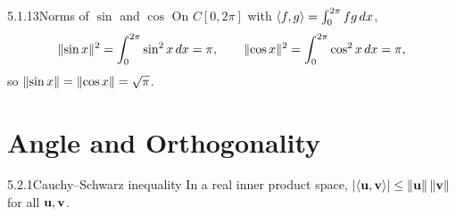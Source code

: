 \begin{exmp}{5.1.13}{Norms of $\sin$ and $\cos$}
On $C[0,2\pi]$ with $\langle f, g \rangle=\int_0^{2\pi}fg\,dx$,
\[
\lVert \sin x \rVert^2=\int_0^{2\pi}\sin^2x\,dx=\pi,\qquad \lVert \cos x \rVert^2=\int_0^{2\pi}\cos^2x\,dx=\pi,
\]
so $\lVert \sin x \rVert=\lVert \cos x \rVert=\sqrt\pi$.
\end{exmp}

\section{Angle and Orthogonality}
\label{sec:5.2}

\begin{thms}{5.2.1}{Cauchy--Schwarz inequality}
In a real inner product space, $\lvert \langle \mathbf{u}, \mathbf{v} \rangle \rvert\le\lVert \mathbf{u} \rVert\,\lVert \mathbf{v} \rVert$ for all $\mathbf{u},\mathbf{v}$.
\end{thms}

